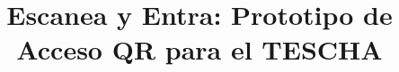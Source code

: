 \documentclass[stu,11pt,floatsintext,biblatex]{apa7}
\title{Escanea y Entra: Prototipo de Acceso QR para el TESCHA}
\begin{document}
\maketitle
\justifying














\printbibliography
\end{document}
